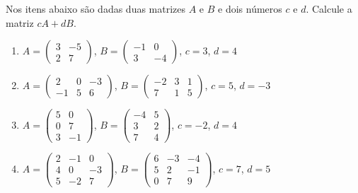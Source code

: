 \documentclass[12pt]{exam}
\begin{document}
    \vspace{.3cm}

    \questao{} Nos itens abaixo são dadas duas matrizes $A$ e $B$ e dois números $c$ e $d$. Calcule a matriz $cA + dB$.
    \begin{enumerate}
        \item $A = \begin{pmatrix}3 & -5\\2 & 7\end{pmatrix}$, $B = \begin{pmatrix}-1 & 0\\3 & -4\end{pmatrix}$, $c = 3$, $d = 4$
        \item $A = \begin{pmatrix}2 & 0 & -3\\-1 & 5 & 6\end{pmatrix}$, $B = \begin{pmatrix}-2 & 3 & 1\\7 & 1 & 5\end{pmatrix}$, $c = 5$, $d = -3$
        \item $A = \begin{pmatrix}5 & 0\\0 & 7\\3 & -1\end{pmatrix}$, $B = \begin{pmatrix}-4 & 5\\3 & 2\\7 & 4\end{pmatrix}$, $c = -2$, $d = 4$
        \item $A = \begin{pmatrix}2 & -1 & 0\\4 & 0 & -3\\5 & -2 & 7\end{pmatrix}$, $B = \begin{pmatrix}6 & -3 & -4\\5 & 2 & -1\\0 & 7 & 9\end{pmatrix}$, $c = 7$, $d = 5$
    \end{enumerate}

    \vspace{.3cm}
\end{document}
